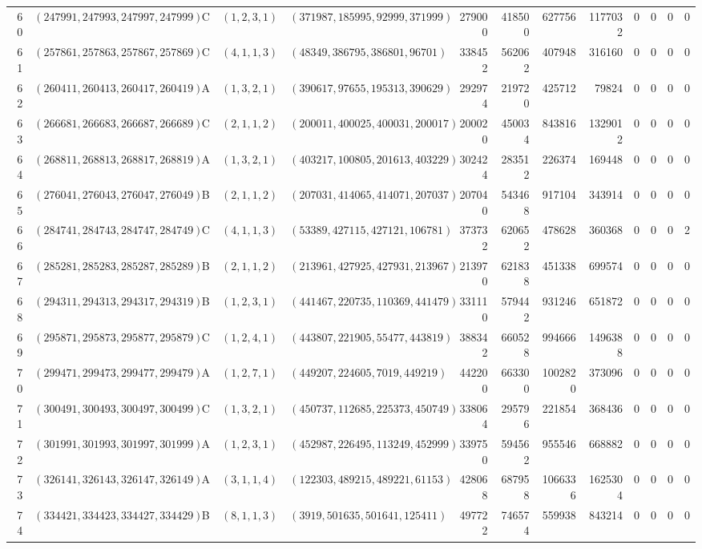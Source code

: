 \begin{longtable}{r l c l l r r r r c c c c}
60 & $(247991,247993,247997,247999)$ & C & $(1,2,3,1)$ & $(371987,185995,92999,371999)$ & 279000 & 418500 & 627756 & 1177032 & 0 & 0 & 0 & 0\\
61 & $(257861,257863,257867,257869)$ & C & $(4,1,1,3)$ & $(48349,386795,386801,96701)$ & 338452 & 562062 & 407948 & 316160 & 0 & 0 & 0 & 0\\
62 & $(260411,260413,260417,260419)$ & A & $(1,3,2,1)$ & $(390617,97655,195313,390629)$ & 292974 & 219720 & 425712 & 79824 & 0 & 0 & 0 & 0\\
63 & $(266681,266683,266687,266689)$ & C & $(2,1,1,2)$ & $(200011,400025,400031,200017)$ & 200020 & 450034 & 843816 & 1329012 & 0 & 0 & 0 & 0\\
64 & $(268811,268813,268817,268819)$ & A & $(1,3,2,1)$ & $(403217,100805,201613,403229)$ & 302424 & 283512 & 226374 & 169448 & 0 & 0 & 0 & 0\\
65 & $(276041,276043,276047,276049)$ & B & $(2,1,1,2)$ & $(207031,414065,414071,207037)$ & 207040 & 543468 & 917104 & 343914 & 0 & 0 & 0 & 0\\
66 & $(284741,284743,284747,284749)$ & C & $(4,1,1,3)$ & $(53389,427115,427121,106781)$ & 373732 & 620652 & 478628 & 360368 & 0 & 0 & 0 & 2\\
67 & $(285281,285283,285287,285289)$ & B & $(2,1,1,2)$ & $(213961,427925,427931,213967)$ & 213970 & 621838 & 451338 & 699574 & 0 & 0 & 0 & 0\\
68 & $(294311,294313,294317,294319)$ & B & $(1,2,3,1)$ & $(441467,220735,110369,441479)$ & 331110 & 579442 & 931246 & 651872 & 0 & 0 & 0 & 0\\
69 & $(295871,295873,295877,295879)$ & C & $(1,2,4,1)$ & $(443807,221905,55477,443819)$ & 388342 & 660528 & 994666 & 1496388 & 0 & 0 & 0 & 0\\
70 & $(299471,299473,299477,299479)$ & A & $(1,2,7,1)$ & $(449207,224605,7019,449219)$ & 442200 & 663300 & 1002820 & 373096 & 0 & 0 & 0 & 0\\
71 & $(300491,300493,300497,300499)$ & C & $(1,3,2,1)$ & $(450737,112685,225373,450749)$ & 338064 & 295796 & 221854 & 368436 & 0 & 0 & 0 & 0\\
72 & $(301991,301993,301997,301999)$ & A & $(1,2,3,1)$ & $(452987,226495,113249,452999)$ & 339750 & 594562 & 955546 & 668882 & 0 & 0 & 0 & 0\\
73 & $(326141,326143,326147,326149)$ & A & $(3,1,1,4)$ & $(122303,489215,489221,61153)$ & 428068 & 687958 & 1066336 & 1625304 & 0 & 0 & 0 & 0\\
74 & $(334421,334423,334427,334429)$ & B & $(8,1,1,3)$ & $(3919,501635,501641,125411)$ & 497722 & 746574 & 559938 & 843214 & 0 & 0 & 0 & 0\\

\end{longtable}
